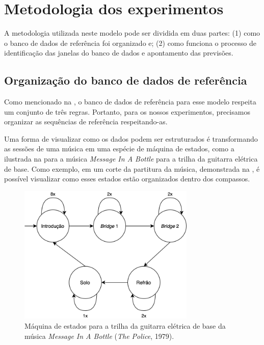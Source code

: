 \section{Metodologia dos experimentos}
\label{sec:dtw-metodology}

A metodologia utilizada neste modelo pode ser dividida em duas partes: (1) como o banco de dados de referência foi organizado e; (2) como funciona o processo de identificação das janelas do banco de dados e apontamento das previsões.

\subsection{Organização do banco de dados de referência}
\label{subsec:database_dtw}

Como mencionado na , o banco de dados de referência para esse modelo respeita um conjunto de três regras. Portanto, para os nossos experimentos, precisamos organizar as sequências de referência respeitando-as.

Uma forma de visualizar como os dados podem ser estruturados é transformando as sessões de uma música em uma espécie de máquina de estados, como a ilustrada na  para a música \textit{Message In A Bottle} para a trilha da guitarra elétrica de base. Como exemplo, em um corte da partitura da música, demonstrada na , é possível visualizar como esses estados estão organizados dentro dos compassos.

\begin{figure}[htbp]
    \centering
    \includegraphics[width=0.75\textwidth]{images/MIAB state machine.png}
    \caption{Máquina de estados para a trilha da guitarra elétrica de base da música \textit{Message In A Bottle} (\textit{The Police}, 1979).}
    \label{fig:miab_state_machine}
\end{figure}

